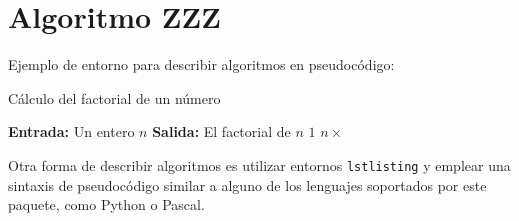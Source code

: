 \section{Algoritmo ZZZ}
\label{sec:algoritmo-zzz}

Ejemplo de entorno para describir algoritmos en pseudocódigo:

\begin{algorithm}[htpb]
    \caption{Cálculo del factorial de un número}\label{alg:factorial}
    \begin{algorithmic}[1]
        \State \textbf{Entrada:} Un entero $n$
        \State \textbf{Salida:} El factorial de $n$
                \State \Return $1$
            \Else
                \State \Return $n \times$ 
            \EndIf
        \EndFunction
    \end{algorithmic}
\end{algorithm}

Otra forma de describir algoritmos es utilizar entornos \texttt{lstlisting} y emplear una sintaxis de pseudocódigo similar a alguno de los lenguajes soportados por este paquete, como Python o Pascal.